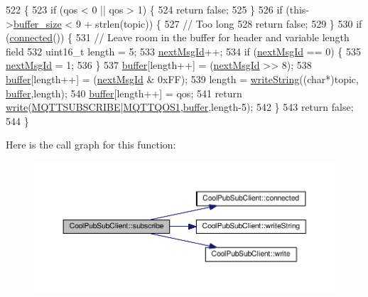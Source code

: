 \begin{DoxyCode}
522                                                                   \{
523     \textcolor{keywordflow}{if} (qos < 0 || qos > 1) \{
524         \textcolor{keywordflow}{return} \textcolor{keyword}{false};
525     \}
526     \textcolor{keywordflow}{if} (this->\hyperlink{class_cool_pub_sub_client_ae6cb10e42c057483d53516ac830ab526}{buffer\_size} < 9 + strlen(topic)) \{
527         \textcolor{comment}{// Too long}
528         \textcolor{keywordflow}{return} \textcolor{keyword}{false};
529     \}
530     \textcolor{keywordflow}{if} (\hyperlink{class_cool_pub_sub_client_a3d5a5da4ddb1e5c1bea64d80c665d148}{connected}()) \{
531         \textcolor{comment}{// Leave room in the buffer for header and variable length field}
532         uint16\_t length = 5;
533         \hyperlink{class_cool_pub_sub_client_af248fa4e54e878e2fece2891eb98d262}{nextMsgId}++;
534         \textcolor{keywordflow}{if} (\hyperlink{class_cool_pub_sub_client_af248fa4e54e878e2fece2891eb98d262}{nextMsgId} == 0) \{
535             \hyperlink{class_cool_pub_sub_client_af248fa4e54e878e2fece2891eb98d262}{nextMsgId} = 1;
536         \}
537         \hyperlink{class_cool_pub_sub_client_a7e8bcc6096626916046a51bebadc7851}{buffer}[length++] = (\hyperlink{class_cool_pub_sub_client_af248fa4e54e878e2fece2891eb98d262}{nextMsgId} >> 8);
538         \hyperlink{class_cool_pub_sub_client_a7e8bcc6096626916046a51bebadc7851}{buffer}[length++] = (\hyperlink{class_cool_pub_sub_client_af248fa4e54e878e2fece2891eb98d262}{nextMsgId} & 0xFF);
539         length = \hyperlink{class_cool_pub_sub_client_a0e3d7e776d4cf4427f9569b28868905a}{writeString}((\textcolor{keywordtype}{char}*)topic, \hyperlink{class_cool_pub_sub_client_a7e8bcc6096626916046a51bebadc7851}{buffer},length);
540         \hyperlink{class_cool_pub_sub_client_a7e8bcc6096626916046a51bebadc7851}{buffer}[length++] = qos;
541         \textcolor{keywordflow}{return} \hyperlink{class_cool_pub_sub_client_a7a8e4854a1846eaa668046d3854d47ad}{write}(\hyperlink{_cool_pub_sub_client_8h_a1f8fd9ffa42a4c4b444d2f3690476ff0}{MQTTSUBSCRIBE}|\hyperlink{_cool_pub_sub_client_8h_a2365b1c4755e7dc1136c3f02488d1d41}{MQTTQOS1},\hyperlink{class_cool_pub_sub_client_a7e8bcc6096626916046a51bebadc7851}{buffer},length-5);
542     \}
543     \textcolor{keywordflow}{return} \textcolor{keyword}{false};
544 \}
\end{DoxyCode}
Here is the call graph for this function\+:\nopagebreak
\begin{figure}[H]
\begin{center}
\leavevmode
\includegraphics[width=350pt]{d8/d4b/class_cool_pub_sub_client_aebf684e98588c52a72af1014f7957bee_cgraph}
\end{center}
\end{figure}
